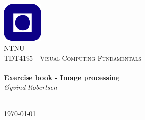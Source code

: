 \begin{titlepage}
\begin{center}
\includegraphics[width=0.15\textwidth]{img/NTNU.png}~\\[1cm]

\textsc{\LARGE NTNU}\\[1.5cm]

\textsc{\Large TDT4195 - Visual Computing Fundamentals}\\[0.5cm]

\HRule \\[0.4cm]
{ \huge \bfseries Exercise book - Image processing}\\[0.5cm]
{\large \textit{Øyvind Robertsen}}\\[0.2cm]
\HRule \\[1.5cm]



\vfill

{\large \today}
\end{center}
\end{titlepage}
